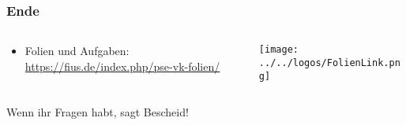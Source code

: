 \begin{frame}[fragile]
    \frametitle{Ende}
    \begin{columns}
        \begin{column}{0.65\textwidth}
            \begin{itemize}
                \item Folien und Aufgaben: \newline \url{https://fius.de/index.php/pse-vk-folien/}
            \end{itemize}
        \end{column}
        \begin{column}{0.35\textwidth}
            \texttt{[image: ../../logos/FolienLink.png]}
        \end{column}
    \end{columns}

    Wenn ihr Fragen habt, sagt Bescheid!

\end{frame}